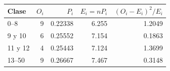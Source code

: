\begin{tabular}{lrrrr}
\toprule
\textbf{Clase} & \textbf{$O_i$} & \textbf{$P_i$} & \textbf{$E_i=nP_i$} & \textbf{$(O_i-E_i)^2/E_i$} \\ \midrule
0–8 & 9 & 0.22338 & 6.255 & 1.2049 \\
9 y 10 & 6 & 0.25552 & 7.154 & 0.1863 \\
11 y 12 & 4 & 0.25443 & 7.124 & 1.3699 \\
13–50 & 9 & 0.26667 & 7.467 & 0.3148 \\
\bottomrule
\end{tabular}